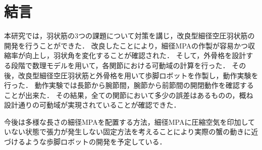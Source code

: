 \newpage
\section{結言}
本研究では，羽状筋の3つの課題について対策を講じ，改良型細径空圧羽状筋の開発を行うことができた．
改良したことにより，細径MPAの作製が容易かつ収縮率が向上し，羽状角を変化することが確認された．
そして，外骨格を設計する段階で数理モデルを用いて，各関節における可動域の計算を行った．
その後，改良型細径空圧羽状筋と外骨格を用いて歩脚ロボットを作製し，動作実験を行った．
動作実験では長節から腕節間，腕節から前節間の開閉動作を確認することが出来た．
その結果，全ての関節において多少の誤差はあるものの，概ね設計通りの可動域が実現されていることが確認できた．


今後は多様な長さの細径MPAを配置する方法，細径MPAに圧縮空気を印加していない状態で張力が発生しない固定方法を考えることにより実際の蟹の動きに近づけるような歩脚ロボットの開発を予定している．
